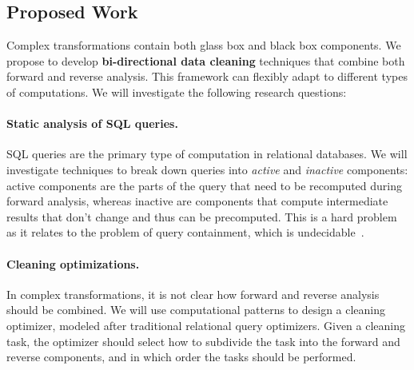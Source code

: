 




\subsection{Proposed Work} %
\label{sub:research_plan}

Complex transformations contain both glass box and black box
components. We propose to develop \textbf{bi-directional data
  cleaning} techniques that combine both forward and reverse
analysis. This framework can flexibly adapt to different types of
computations. We will investigate the following research questions:

\paragraph{Static analysis of SQL queries.} %
\label{par:static_analysis_of_sql_queries}
SQL queries are the primary type of computation in relational databases. We will investigate techniques to break down queries into \emph{active} and \emph{inactive} components: active components are the parts of the query that need to be recomputed during forward analysis, whereas inactive are components that compute intermediate results that don't change and thus can be precomputed. This is a hard problem as it relates to the problem of query containment, which is undecidable~\cite{DBLP:conf/pods/CalvaneseGL98}.

\paragraph{Cleaning optimizations.} %
\label{par:cleaning_optimizations}
In complex transformations, it is not clear how forward and reverse analysis
should be combined. We will use computational patterns to design a cleaning
optimizer, modeled after traditional relational query optimizers. Given a
cleaning task, the optimizer should select how to subdivide the task into the
forward and reverse components, and in which order the tasks should be
performed.

